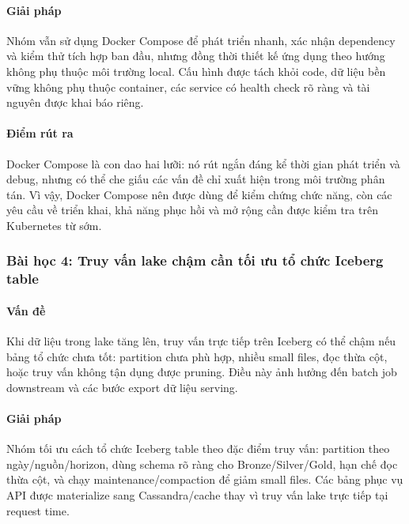 \documentclass[12pt,a4paper]{article}
\begin{document}
\paragraph{Giải pháp}\label{giai-phap-docker-compose-kubernetes}

Nhóm vẫn sử dụng Docker Compose để phát triển nhanh, xác nhận dependency và kiểm thử tích hợp ban đầu, nhưng đồng thời thiết kế ứng dụng theo hướng không phụ thuộc môi trường local. Cấu hình được tách khỏi code, dữ liệu bền vững không phụ thuộc container, các service có health check rõ ràng và tài nguyên được khai báo riêng.

\paragraph{Điểm rút ra}\label{diem-rut-ra-docker-compose-kubernetes}

Docker Compose là con dao hai lưỡi: nó rút ngắn đáng kể thời gian phát triển và debug, nhưng có thể che giấu các vấn đề chỉ xuất hiện trong môi trường phân tán. Vì vậy, Docker Compose nên được dùng để kiểm chứng chức năng, còn các yêu cầu về triển khai, khả năng phục hồi và mở rộng cần được kiểm tra trên Kubernetes từ sớm.

\subsubsection{Bài học 4: Truy vấn lake chậm cần tối ưu tổ chức Iceberg table}\label{bai-hoc-4-truy-van-lake-cham-can-toi-uu-iceberg-table}

\paragraph{Vấn đề}\label{van-de-truy-van-lake-cham}

Khi dữ liệu trong lake tăng lên, truy vấn trực tiếp trên Iceberg có thể chậm nếu bảng tổ chức chưa tốt: partition chưa phù hợp, nhiều small files, đọc thừa cột, hoặc truy vấn không tận dụng được pruning. Điều này ảnh hưởng đến batch job downstream và các bước export dữ liệu serving.

\paragraph{Giải pháp}\label{giai-phap-toi-uu-iceberg-table}

Nhóm tối ưu cách tổ chức Iceberg table theo đặc điểm truy vấn: partition theo ngày/nguồn/horizon, dùng schema rõ ràng cho Bronze/Silver/Gold, hạn chế đọc thừa cột, và chạy maintenance/compaction để giảm small files. Các bảng phục vụ API được materialize sang Cassandra/cache thay vì truy vấn lake trực tiếp tại request time.
\end{document}
